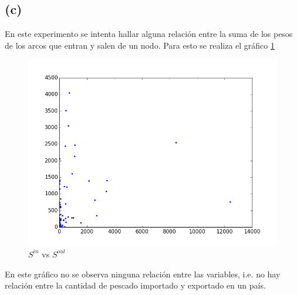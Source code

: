 \documentclass[letterpaper]{article}
\begin{document}
\subsection*{(c)}
En este experimento se intenta hallar alguna relación entre la suma de los pesos de los arcos que entran y salen de un nodo. Para esto se realiza el gráfico \ref{chart:2}
\begin{figure}[H]
  \centering
  \includegraphics[width=.75\linewidth]{img/p9-s-s.png}\hfill
  \caption{$S^{in}$ vs $S^{out}$}
  \label{chart:2}
\end{figure}

En este gráfico no se observa ninguna relación entre las variables, i.e. no hay relación entre la cantidad de pescado importado y exportado en un país.
\end{document}
